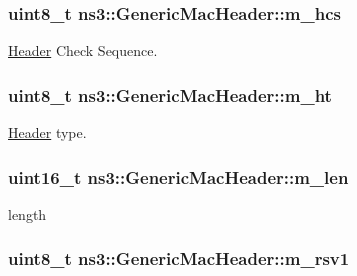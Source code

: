 \subsubsection[{\texorpdfstring{m\+\_\+hcs}{m_hcs}}]{\setlength{\rightskip}{0pt plus 5cm}uint8\+\_\+t ns3\+::\+Generic\+Mac\+Header\+::m\+\_\+hcs\hspace{0.3cm}{\ttfamily [private]}}\hypertarget{classns3_1_1GenericMacHeader_a1fd241718b50431acfdba2310dff52d1}{}\label{classns3_1_1GenericMacHeader_a1fd241718b50431acfdba2310dff52d1}


\hyperlink{classns3_1_1Header}{Header} Check Sequence. 

\subsubsection[{\texorpdfstring{m\+\_\+ht}{m_ht}}]{\setlength{\rightskip}{0pt plus 5cm}uint8\+\_\+t ns3\+::\+Generic\+Mac\+Header\+::m\+\_\+ht\hspace{0.3cm}{\ttfamily [private]}}\hypertarget{classns3_1_1GenericMacHeader_a35c4cce15809ec8472e236d4595693b0}{}\label{classns3_1_1GenericMacHeader_a35c4cce15809ec8472e236d4595693b0}


\hyperlink{classns3_1_1Header}{Header} type. 

\subsubsection[{\texorpdfstring{m\+\_\+len}{m_len}}]{\setlength{\rightskip}{0pt plus 5cm}uint16\+\_\+t ns3\+::\+Generic\+Mac\+Header\+::m\+\_\+len\hspace{0.3cm}{\ttfamily [private]}}\hypertarget{classns3_1_1GenericMacHeader_a654e7aa3e36a5d055e72ffee0907ce46}{}\label{classns3_1_1GenericMacHeader_a654e7aa3e36a5d055e72ffee0907ce46}


length 

\subsubsection[{\texorpdfstring{m\+\_\+rsv1}{m_rsv1}}]{\setlength{\rightskip}{0pt plus 5cm}uint8\+\_\+t ns3\+::\+Generic\+Mac\+Header\+::m\+\_\+rsv1\hspace{0.3cm}{\ttfamily [private]}}\hypertarget{classns3_1_1GenericMacHeader_a4a38605264c8e8c6f3e7f28f772f5308}{}\label{classns3_1_1GenericMacHeader_a4a38605264c8e8c6f3e7f28f772f5308}


